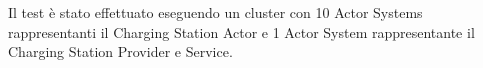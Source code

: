 Il test è stato effettuato eseguendo un cluster con 10 Actor Systems rappresentanti il Charging Station Actor e 1 Actor System rappresentante il Charging Station Provider e Service.\\







\newpage